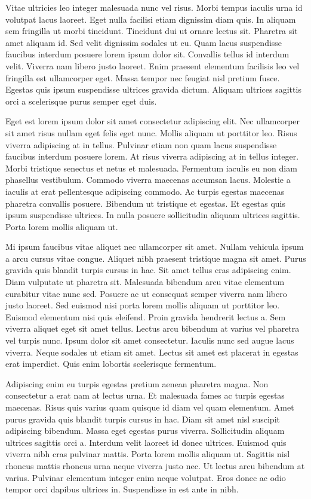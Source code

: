 \documentclass[11pt,a4paper]{article}
\begin{document}
Vitae ultricies leo integer malesuada nunc vel risus. Morbi tempus iaculis urna id volutpat lacus laoreet. Eget nulla facilisi etiam dignissim diam quis. In aliquam sem fringilla ut morbi tincidunt. Tincidunt dui ut ornare lectus sit. Pharetra sit amet aliquam id. Sed velit dignissim sodales ut eu. Quam lacus suspendisse faucibus interdum posuere lorem ipsum dolor sit. Convallis tellus id interdum velit. Viverra nam libero justo laoreet. Enim praesent elementum facilisis leo vel fringilla est ullamcorper eget. Massa tempor nec feugiat nisl pretium fusce. Egestas quis ipsum suspendisse ultrices gravida dictum. Aliquam ultrices sagittis orci a scelerisque purus semper eget duis.

Eget est lorem ipsum dolor sit amet consectetur adipiscing elit. Nec ullamcorper sit amet risus nullam eget felis eget nunc. Mollis aliquam ut porttitor leo. Risus viverra adipiscing at in tellus. Pulvinar etiam non quam lacus suspendisse faucibus interdum posuere lorem. At risus viverra adipiscing at in tellus integer. Morbi tristique senectus et netus et malesuada. Fermentum iaculis eu non diam phasellus vestibulum. Commodo viverra maecenas accumsan lacus. Molestie a iaculis at erat pellentesque adipiscing commodo. Ac turpis egestas maecenas pharetra convallis posuere. Bibendum ut tristique et egestas. Et egestas quis ipsum suspendisse ultrices. In nulla posuere sollicitudin aliquam ultrices sagittis. Porta lorem mollis aliquam ut.

Mi ipsum faucibus vitae aliquet nec ullamcorper sit amet. Nullam vehicula ipsum a arcu cursus vitae congue. Aliquet nibh praesent tristique magna sit amet. Purus gravida quis blandit turpis cursus in hac. Sit amet tellus cras adipiscing enim. Diam vulputate ut pharetra sit. Malesuada bibendum arcu vitae elementum curabitur vitae nunc sed. Posuere ac ut consequat semper viverra nam libero justo laoreet. Sed euismod nisi porta lorem mollis aliquam ut porttitor leo. Euismod elementum nisi quis eleifend. Proin gravida hendrerit lectus a. Sem viverra aliquet eget sit amet tellus. Lectus arcu bibendum at varius vel pharetra vel turpis nunc. Ipsum dolor sit amet consectetur. Iaculis nunc sed augue lacus viverra. Neque sodales ut etiam sit amet. Lectus sit amet est placerat in egestas erat imperdiet. Quis enim lobortis scelerisque fermentum.

Adipiscing enim eu turpis egestas pretium aenean pharetra magna. Non consectetur a erat nam at lectus urna. Et malesuada fames ac turpis egestas maecenas. Risus quis varius quam quisque id diam vel quam elementum. Amet purus gravida quis blandit turpis cursus in hac. Diam sit amet nisl suscipit adipiscing bibendum. Massa eget egestas purus viverra. Sollicitudin aliquam ultrices sagittis orci a. Interdum velit laoreet id donec ultrices. Euismod quis viverra nibh cras pulvinar mattis. Porta lorem mollis aliquam ut. Sagittis nisl rhoncus mattis rhoncus urna neque viverra justo nec. Ut lectus arcu bibendum at varius. Pulvinar elementum integer enim neque volutpat. Eros donec ac odio tempor orci dapibus ultrices in. Suspendisse in est ante in nibh.
\end{document}
